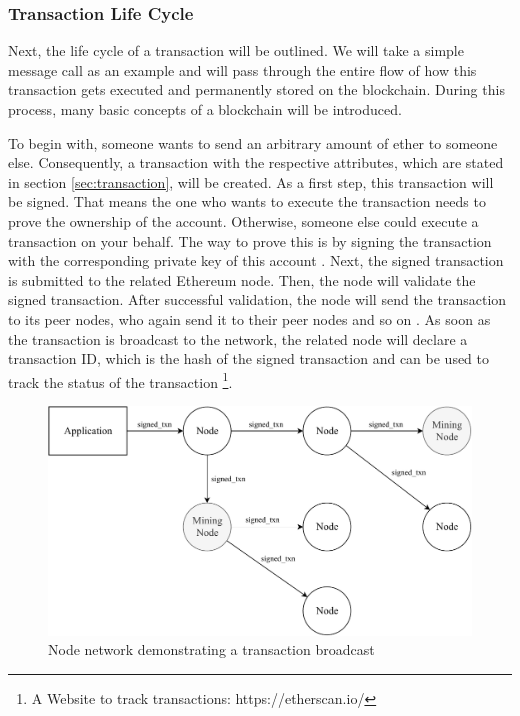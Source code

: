 \subsubsection{Transaction Life Cycle}
\label{sec:transaction_lifecycle}
Next, the life cycle of a transaction will be outlined. 
We will take a simple message call as an example 
and will pass through the entire flow of how this transaction 
gets executed and permanently stored on the blockchain. 
During this process, many basic concepts of a blockchain will be introduced. 

To begin with, someone wants to send an arbitrary amount of ether to someone else. 
Consequently, a transaction with the respective attributes, which are stated 
in section \ref{sec:transaction}, will be created. As a first step, this transaction 
will be signed. That means the one who wants to execute the transaction needs to prove the 
ownership of the account. Otherwise, someone else could execute a transaction on your behalf. 
The way to prove this is by signing the transaction with the corresponding private
key of this account . 
Next, the signed transaction is submitted to the related Ethereum node. 
Then, the node will validate the signed transaction. 
After successful validation, the node will send the transaction to 
its peer nodes, who again send it to their 
peer nodes and so on . 
As soon as the transaction is broadcast to the network, 
the related node will declare a transaction ID, which is the hash 
of the signed transaction and can be used to track the 
status of the transaction \footnote{A Website to track transactions: https://etherscan.io/}. 

\begin{figure}[htbp]
	\centering
	\includegraphics[width=1\linewidth]{./figures/node_network.pdf}
	\caption{Node network demonstrating a transaction broadcast}
	\label{figure:node_network}
\end{figure}

